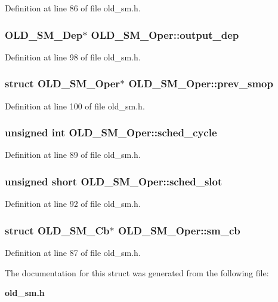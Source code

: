 Definition at line 86 of file old\_\-sm.h.
\subsubsection{\setlength{\rightskip}{0pt plus 5cm}\bf{OLD\_\-SM\_\-Dep}$\ast$ \bf{OLD\_\-SM\_\-Oper::output\_\-dep}}\label{structOLD__SM__Oper_99831f15ddf4b8f1564358d20058538b}




Definition at line 98 of file old\_\-sm.h.
\subsubsection{\setlength{\rightskip}{0pt plus 5cm}struct \bf{OLD\_\-SM\_\-Oper}$\ast$ \bf{OLD\_\-SM\_\-Oper::prev\_\-smop}}\label{structOLD__SM__Oper_82ded9872fcbf2fd2ab31d0100ce85e6}




Definition at line 100 of file old\_\-sm.h.
\subsubsection{\setlength{\rightskip}{0pt plus 5cm}unsigned int \bf{OLD\_\-SM\_\-Oper::sched\_\-cycle}}\label{structOLD__SM__Oper_6c3c71e5fc5a42f4538e479f11b1b0f9}




Definition at line 89 of file old\_\-sm.h.
\subsubsection{\setlength{\rightskip}{0pt plus 5cm}unsigned short \bf{OLD\_\-SM\_\-Oper::sched\_\-slot}}\label{structOLD__SM__Oper_d58062620a2f5546f706edcf33df8a51}




Definition at line 92 of file old\_\-sm.h.
\subsubsection{\setlength{\rightskip}{0pt plus 5cm}struct \bf{OLD\_\-SM\_\-Cb}$\ast$ \bf{OLD\_\-SM\_\-Oper::sm\_\-cb}}\label{structOLD__SM__Oper_3f65491bf5683015f9f016e0607eec46}




Definition at line 87 of file old\_\-sm.h.

The documentation for this struct was generated from the following file:\begin{CompactItemize}
\item 
\bf{old\_\-sm.h}\end{CompactItemize}
